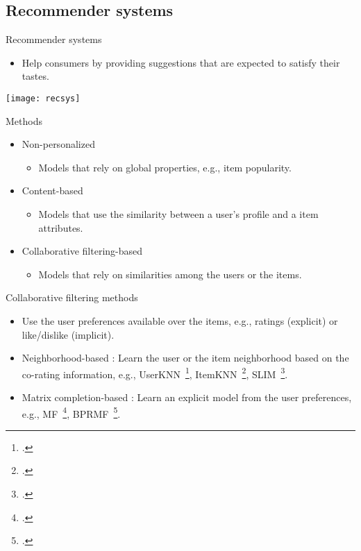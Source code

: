 \subsection{Recommender systems}

\begin{frame}{Recommender systems}
    \begin{itemize}
        \item Help consumers by providing suggestions that are expected to satisfy
            their tastes.
    \end{itemize}
    \begin{center}
        \texttt{[image: recsys]}
    \end{center}
\end{frame}


\begin{frame}{Methods}
    \begin{itemize}
        \item Non-personalized 
            \begin{itemize}
                \item Models that rely on global properties, e.g., item popularity.
            \end{itemize}
        \item Content-based
            \begin{itemize}
                \item Models that use the similarity between a user's profile and a item attributes. 
            \end{itemize}
        \item Collaborative filtering-based
            \begin{itemize}
                \item Models that rely on similarities among the users or the items.
            \end{itemize}
    \end{itemize}
\end{frame}


\begin{frame}{Collaborative filtering methods}
    \begin{itemize}
        \item Use the user preferences available over the items, e.g., ratings (explicit) or like/dislike (implicit). 

        \item Neighborhood-based : Learn the user or the item neighborhood based on the co-rating information, e.g., UserKNN~\footcite{herlocker1999algorithmic}, ItemKNN~\footcite{SarwarKarypis01}, SLIM~\footcite{r0}.

        \item Matrix completion-based : Learn an explicit model from the user preferences, e.g., MF~\footcite{Koren2009}, BPRMF~\footcite{rendle2009bpr}.

    \end{itemize}
\end{frame}



